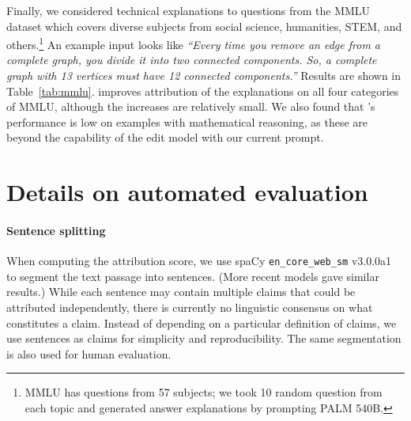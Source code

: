 \documentclass[11pt]{article}
\begin{document}
\begin{table}[!t]
\centering\small
{}
\caption{\textbf{\approach{} results on MMLU.}}
\label{tab:mmlu}
\end{table}




Finally, we considered technical explanations to questions from the MMLU dataset \cite{hendryckstest2021} which covers diverse subjects from social science, humanities, STEM, and others.\footnote{MMLU has questions from 57 subjects; we took 10 random question from each topic and generated answer explanations by prompting PALM 540B.} An example input looks like \textit{ ``Every time you remove an edge from a complete graph, you divide it into two connected components. So, a complete graph with 13 vertices must have 12 connected components.''} Results are shown in Table~\ref{tab:mmlu}. \approach{} improves attribution of the explanations on all four categories of MMLU, although the increases are relatively small. We also found that \approach{}'s performance is low on examples with mathematical reasoning, as these are beyond the capability of the edit model with our current prompt.

\section{Details on automated evaluation}\label{sec:app-auto-eval}
\paragraph{Sentence splitting} When computing the attribution score, we use spaCy \verb|en_core_web_sm| v3.0.0a1 to segment the text passage into sentences. (More recent models gave similar results.) While each sentence may contain multiple claims that could be attributed independently, there is currently no linguistic consensus on what constitutes a claim. Instead of depending on a particular definition of claims, we use sentences as claims for simplicity and reproducibility. The same segmentation is also used for human evaluation.
\end{document}
